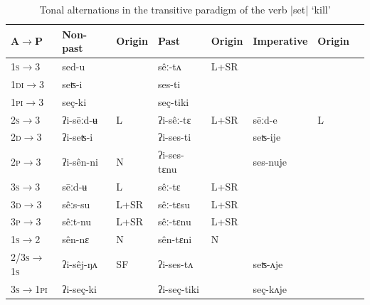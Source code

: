 \documentclass[oldfontcommands,oneside,a4paper,11pt]{article}
\newcommand{\ipa}[1]{{\phon \mbox{#1}}} %
\begin{document}
\begin{table}[h]
\caption{Tonal alternations in the transitive paradigm of the verb |\ipa{set}| `kill' } \label{tab:trans.paradigm2} \centering
\begin{tabular}{llllllll}
\toprule
A$\rightarrow$P& Non-past & Origin & Past & Origin& Imperative& Origin\\
\midrule
\textsc{1s}$\rightarrow$3 & \ipa{sed-u} & & \ipa{sêː-tʌ} &L+SR  &  \\
\textsc{1di}$\rightarrow$3 & \ipa{seʦ-i} &  & \ipa{ses-ti}  & \\
\textsc{1pi}$\rightarrow$3 & \ipa{seç-ki} &  & \ipa{seç-tiki} \\
\textsc{2s}$\rightarrow$3 & \ipa{ʔi-sēːd-ʉ} & L  & \ipa{ʔi-sêː-tɛ} &L+SR  &\ipa{sēːd-e} & L\\
\textsc{2d}$\rightarrow$3 & \ipa{ʔi-seʦ-i} & &  \ipa{ʔi-ses-ti} & & \ipa{seʦ-ije} & \\
\textsc{2p}$\rightarrow$3 & \ipa{ʔi-sên-ni} & N & \ipa{ʔi-ses-tɛnu} & &\ipa{ses-nuje} &\\
\textsc{3s}$\rightarrow$3 & \ipa{sēːd-ʉ} & L &\ipa{sêː-tɛ} & L+SR\\
\textsc{3d}$\rightarrow$3 & \ipa{sêːs-su} &L+SR& \ipa{sêː-tɛsu}   & L+SR\\
\textsc{3p}$\rightarrow$3 & \ipa{sêːt-nu} & L+SR& \ipa{sêː-tɛnu} & L+SR\\
\midrule
\textsc{1s}$\rightarrow$2 & \ipa{sên-nɛ} &N& \ipa{sên-tɛni} &N\\
\textsc{2/3s$\rightarrow$1s} & \ipa{ʔi-sêj-ŋʌ} &SF &\ipa{ʔi-ses-tʌ} & &\ipa{seʦ-ʌje}\\
\textsc{3s$\rightarrow$1pi} & \ipa{ʔi-seç-ki} & &\ipa{ʔi-seç-tiki} & &\ipa{seç-kʌje}\\
\bottomrule
\end{tabular}
\end{table}
\end{document}
